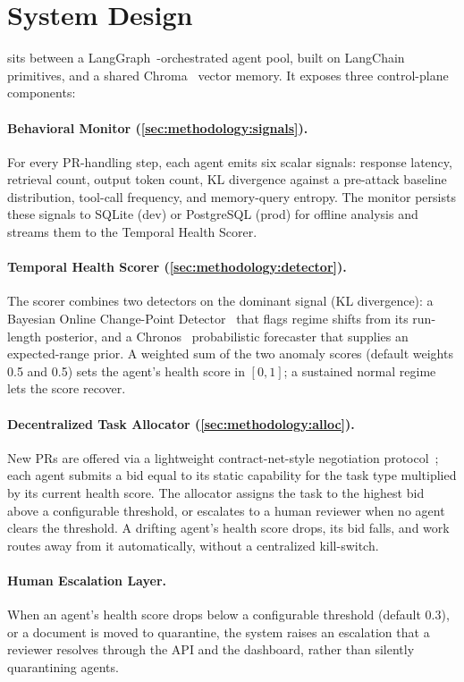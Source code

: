 \section{System Design}
\label{sec:system}

\sys{} sits between a LangGraph~\citep{langgraph}-orchestrated agent
pool, built on LangChain~\citep{langchain} primitives, and a shared
Chroma~\citep{chromadb} vector memory. It exposes three control-plane
components:

\paragraph{Behavioral Monitor (\cref{sec:methodology:signals}).}
For every PR-handling step, each agent emits six scalar signals:
response latency, retrieval count, output token count, KL
divergence against a pre-attack baseline distribution, tool-call
frequency, and memory-query entropy. The monitor persists these
signals to SQLite (dev) or PostgreSQL (prod) for offline analysis
and streams them to the Temporal Health Scorer.

\paragraph{Temporal Health Scorer (\cref{sec:methodology:detector}).}
The scorer combines two detectors on the dominant signal
(KL divergence): a Bayesian Online Change-Point
Detector~\citep{adams2007bocpd} that flags regime shifts from its
run-length posterior, and a Chronos~\citep{chronos}
probabilistic forecaster that supplies an expected-range prior. A
weighted sum of the two anomaly scores (default weights 0.5 and 0.5)
sets the agent's health score in $[0, 1]$; a sustained normal regime
lets the score recover.

\paragraph{Decentralized Task Allocator (\cref{sec:methodology:alloc}).}
New PRs are offered via a lightweight contract-net-style negotiation
protocol~\citep{contractnet}; each agent submits a bid equal to its
static capability for the task type multiplied by its current health
score. The allocator assigns the task to the highest bid above a
configurable threshold, or escalates to a human reviewer when no
agent clears the threshold. A drifting agent's health score drops,
its bid falls, and work routes away from it automatically, without
a centralized kill-switch.

\paragraph{Human Escalation Layer.}
When an agent's health score drops below a configurable threshold
(default 0.3), or a document is moved to quarantine, the system raises
an escalation that a reviewer resolves through the API and the
dashboard, rather than silently quarantining agents.
